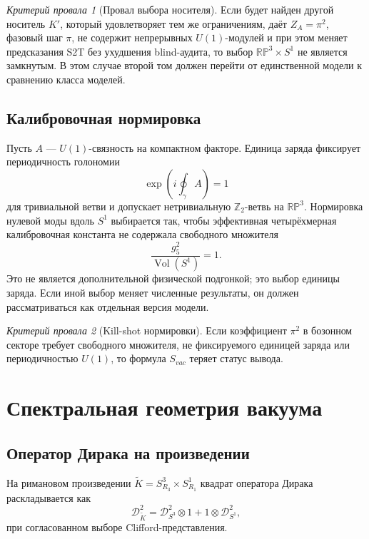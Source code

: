 \documentclass[12pt,a4paper]{report}
\theoremstyle{remark}
\newtheorem{nogocriterion}{Критерий провала}[chapter]
\DeclareMathOperator{\Vol}{Vol}
\begin{document}
\begin{nogocriterion}[Провал выбора носителя]
Если будет найден другой носитель \(K'\), который удовлетворяет тем же ограничениям, даёт \(Z_A=\pi^2\), фазовый шаг \(\pi\), не содержит непрерывных \(U(1)\)-модулей и при этом меняет предсказания S2T без ухудшения blind-аудита, то выбор \(\mathbb{RP}^3\times S^1\) не является замкнутым. В этом случае второй том должен перейти от единственной модели к сравнению класса моделей.
\end{nogocriterion}

\section{Калибровочная нормировка}

Пусть \(A\) --- \(U(1)\)-связность на компактном факторе. Единица заряда фиксирует периодичность голономии
\begin{equation}
    \exp\left(i\oint_\gamma A\right)=1
\end{equation}
для тривиальной ветви и допускает нетривиальную \(\mathbb{Z}_2\)-ветвь на \(\mathbb{RP}^3\). Нормировка нулевой моды вдоль \(S^1\) выбирается так, чтобы эффективная четырёхмерная калибровочная константа не содержала свободного множителя
\begin{equation}
    \frac{g_5^2}{\Vol(S^1)}=1.
\end{equation}
Это не является дополнительной физической подгонкой; это выбор единицы заряда. Если иной выбор меняет численные результаты, он должен рассматриваться как отдельная версия модели.

\begin{nogocriterion}[Kill-shot нормировки]
Если коэффициент \(\pi^2\) в бозонном секторе требует свободного множителя, не фиксируемого единицей заряда или периодичностью \(U(1)\), то формула \(S_{vac}\) теряет статус вывода.
\end{nogocriterion}

\chapter{Спектральная геометрия вакуума}

\section{Оператор Дирака на произведении}

На римановом произведении \(\widetilde K=S^3_{R_3}\times S^1_{R_1}\) квадрат оператора Дирака раскладывается как
\begin{equation}
    \mathcal{D}_{\widetilde K}^2
    =\mathcal{D}_{S^3}^2\otimes 1 + 1\otimes \mathcal{D}_{S^1}^2,
\end{equation}
при согласованном выборе Clifford-представления.
\end{document}
